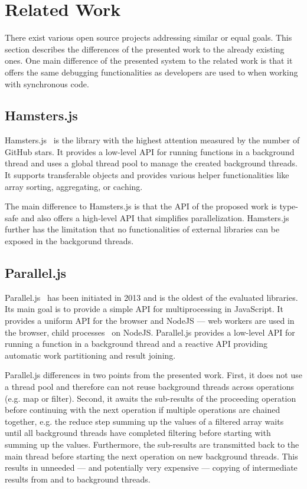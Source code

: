 \section{Related Work}\label{sec:related-work}
There exist various open source projects addressing similar or equal goals. This section describes the differences of the presented work to the already existing ones. One main difference of the presented system to the related work is that it offers the same debugging functionalities as developers are used to when working with synchronous code.

\subsection{Hamsters.js}
Hamsters.js~\cite{hamstersjs} is the library with the highest attention measured by the number of GitHub stars. It provides a low-level API for running functions in a background thread and uses a global thread pool to manage the created background threads. It supports transferable objects and provides various helper functionalities like array sorting, aggregating, or caching.

The main difference to Hamsters.js is that the API of the proposed work is type-safe and also offers a high-level API that simplifies parallelization. Hamsters.js further has the limitation that no functionalities of external libraries can be exposed in the backgorund threads.

\subsection{Parallel.js}
Parallel.js~\cite{SavitzkyMayr2016} has been initiated in 2013 and is the oldest of the evaluated libraries. Its main goal is to provide a simple API for multiprocessing in JavaScript. It provides a uniform API for the browser and NodeJS --- web workers are used in the browser, child processes~\cite{childProcess} on NodeJS. Parallel.js provides a low-level API for running a function in a background thread and a reactive API providing automatic work partitioning and result joining. 

Parallel.js differences in two points from the presented work. First, it does not use a thread pool and therefore can not reuse background threads across operations (e.g. map or filter). Second, it awaits the sub-results of the proceeding operation before continuing with the next operation if multiple operations are chained together, e.g. the reduce step summing up the values of a filtered array waits until all background threads have completed filtering before starting with summing up the values. Furthermore, the sub-results are transmitted back to the main thread before starting the next operation on new background threads. This results in unneeded --- and potentially very expensive --- copying of intermediate results from and to background threads.


